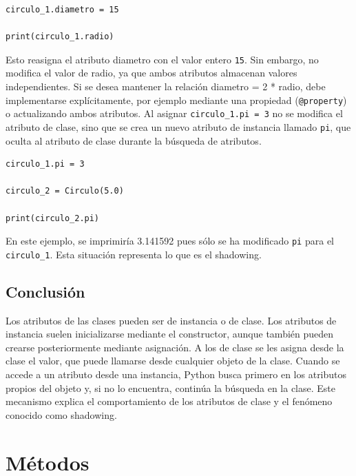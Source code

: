 \documentclass[11pt,a5paper,twoside]{book}
\begin{document}
\begin{tcolorbox}
\scriptsize
 \begin{verbatim}
circulo_1.diametro = 15

print(circulo_1.radio)
\end{verbatim}
\end{tcolorbox}
Esto reasigna el atributo diametro con el valor entero {\scriptsize \texttt{15}}. Sin embargo, no modifica el valor de radio, ya que ambos atributos almacenan valores independientes. Si se desea mantener la relación diametro = 2 * radio, debe implementarse explícitamente, por ejemplo mediante una propiedad ({\scriptsize \texttt{@property}}) o actualizando ambos atributos.
Al asignar {\scriptsize \texttt{circulo\_1.pi = 3}} no se modifica el atributo de clase, sino que se crea un nuevo atributo de instancia llamado {\scriptsize \texttt{pi}}, que oculta al atributo de clase durante la búsqueda de atributos.


\begin{tcolorbox}
\scriptsize
 \begin{verbatim}
circulo_1.pi = 3

circulo_2 = Circulo(5.0)

print(circulo_2.pi)
\end{verbatim}
\end{tcolorbox}
En este ejemplo, se imprimiría 3.141592 pues sólo se ha modificado {\scriptsize \texttt{pi}} para el {\scriptsize \texttt{circulo\_1}}. Esta situación representa lo que es el shadowing.
\subsection{Conclusión}
Los atributos de las clases pueden ser de instancia o de clase.
Los atributos de instancia suelen inicializarse mediante el constructor, aunque también pueden crearse posteriormente mediante asignación.
A los de clase se les asigna desde la clase el valor, que puede llamarse desde cualquier objeto de la clase.
Cuando se accede a un atributo desde una instancia, Python busca primero en los atributos propios del objeto y, si no lo encuentra, continúa la búsqueda en la clase. Este mecanismo explica el comportamiento de los atributos de clase y el fenómeno conocido como shadowing.

\newpage

\section{Métodos}
\end{document}
